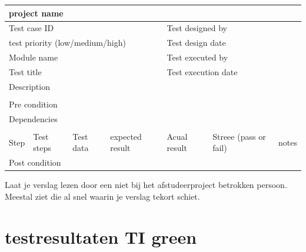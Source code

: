 			\begin{tabular}{|l|l|l|l|l|l|l|} \hline
				\multicolumn{7}{|l|}{project name}                                                               \\ \hline
				\multicolumn{4}{|l|}{Test case ID}   &\multicolumn{3}{|l|}{Test designed by}                           \\ \hline
				\multicolumn{4}{|l|}{test priority (low/medium/high)}   &\multicolumn{3}{|l|}{Test design date}                           \\ \hline
				\multicolumn{4}{|l|}{Module name}   &\multicolumn{3}{|l|}{Test executed by}                           \\ \hline
				\multicolumn{4}{|l|}{Test title}   &\multicolumn{3}{|l|}{Test execution date}                           \\ \hline
				\multicolumn{4}{|l|}{Description}   &\multicolumn{3}{|l|}{ }                           \\ \hline 		
				\multicolumn{7}{|l|}{ }   																\\ \hline
				\multicolumn{7}{|l|}{Pre condition}                                                               \\ \hline
				\multicolumn{7}{|l|}{Dependencies}                                                               \\ \hline
				\multicolumn{7}{|l|}{ }   															\\ \hline
				Step  &  Test steps & Test data & expected result &Acual result &Streee (pass or fail)&notes  \\ \hline
				\multicolumn{7}{|l|}{Post condition}                                                               \\ \hline
			\end{tabular}
			
			Laat je verslag lezen door een niet bij het afstudeerproject betrokken
			persoon. Meestal ziet die al snel waarin je verslag tekort schiet.
			
			
			\begin{center}
			\end{center}
			
			
			
			
			
			
			
			
			\section{testresultaten TI green}
			
